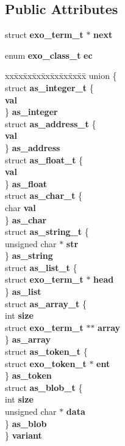 \subsection*{Public Attributes}
\begin{CompactItemize}
\item 
struct {\bf exo\_\-term\_\-t} $\ast$ {\bf next}
\item 
enum {\bf exo\_\-class\_\-t} {\bf ec}
\item 
\begin{tabbing}
xx\=xx\=xx\=xx\=xx\=xx\=xx\=xx\=xx\=\kill
union \{\\
\>struct \textbf{as\_integer\_t} \{\\
\> {\bf val}\\
\>\} {\bf as\_integer}\\
\>struct \textbf{as\_address\_t} \{\\
\> {\bf val}\\
\>\} {\bf as\_address}\\
\>struct \textbf{as\_float\_t} \{\\
\> {\bf val}\\
\>\} {\bf as\_float}\\
\>struct \textbf{as\_char\_t} \{\\
\>\>char {\bf val}\\
\>\} {\bf as\_char}\\
\>struct \textbf{as\_string\_t} \{\\
\>\>unsigned char $\ast$ {\bf str}\\
\>\} {\bf as\_string}\\
\>struct \textbf{as\_list\_t} \{\\
\>\>struct {\bf exo\_term\_t} $\ast$ {\bf head}\\
\>\} {\bf as\_list}\\
\>struct \textbf{as\_array\_t} \{\\
\>\>int {\bf size}\\
\>\>struct {\bf exo\_term\_t} $\ast$$\ast$ {\bf array}\\
\>\} {\bf as\_array}\\
\>struct \textbf{as\_token\_t} \{\\
\>\>struct {\bf exo\_token\_t} $\ast$ {\bf ent}\\
\>\} {\bf as\_token}\\
\>struct \textbf{as\_blob\_t} \{\\
\>\>int {\bf size}\\
\>\>unsigned char $\ast$ {\bf data}\\
\>\} {\bf as\_blob}\\
\} {\bf variant}\\

\end{tabbing}\end{CompactItemize}


